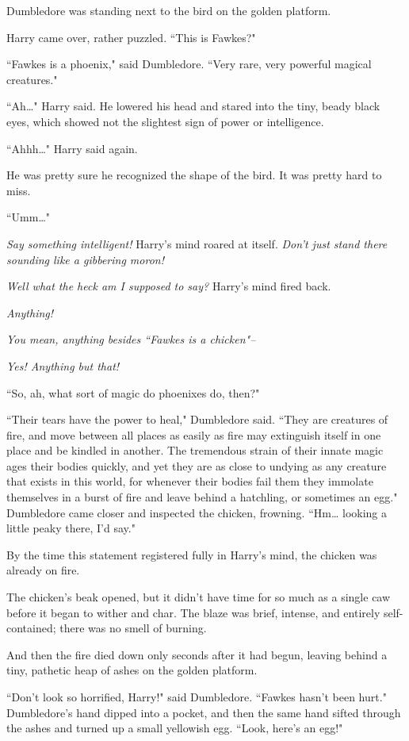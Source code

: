 Dumbledore was standing next to the bird on the golden platform.

Harry came over, rather puzzled. ``This is Fawkes?"

``Fawkes is a phoenix," said Dumbledore. ``Very rare, very powerful magical creatures."

``Ah{\ldots}" Harry said. He lowered his head and stared into the tiny, beady black eyes, which showed not the slightest sign of power or intelligence.

``Ahhh{\ldots}" Harry said again.

He was pretty sure he recognized the shape of the bird. It was pretty hard to miss.

``Umm{\ldots}"

\emph{Say something intelligent!} Harry's mind roared at itself. \emph{Don't just stand there sounding like a gibbering moron!}

\emph{Well what the heck am I \emph{supposed} to say?} Harry's mind fired back.

\emph{Anything!}

\emph{You mean, anything besides ``Fawkes is a chicken"\---}

\emph{Yes! Anything but that!}

``So, ah, what sort of magic do phoenixes do, then?"

``Their tears have the power to heal," Dumbledore said. ``They are creatures of fire, and move between all places as easily as fire may extinguish itself in one place and be kindled in another. The tremendous strain of their innate magic ages their bodies quickly, and yet they are as close to undying as any creature that exists in this world, for whenever their bodies fail them they immolate themselves in a burst of fire and leave behind a hatchling, or sometimes an egg." Dumbledore came closer and inspected the chicken, frowning. ``Hm{\ldots} looking a little peaky there, I'd say."

By the time this statement registered fully in Harry's mind, the chicken was already on fire.

The chicken's beak opened, but it didn't have time for so much as a single caw before it began to wither and char. The blaze was brief, intense, and entirely self-contained; there was no smell of burning.

And then the fire died down only seconds after it had begun, leaving behind a tiny, pathetic heap of ashes on the golden platform.

``Don't look so horrified, Harry!" said Dumbledore. ``Fawkes hasn't been hurt." Dumbledore's hand dipped into a pocket, and then the same hand sifted through the ashes and turned up a small yellowish egg. ``Look, here's an egg!"

